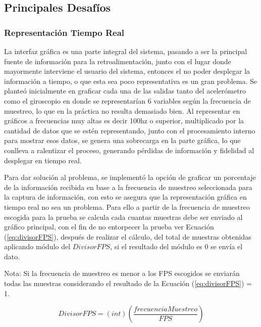 \documentclass[12pt,a4paper]{article}
\begin{document}
\begin{itemize}
\end{itemize}





\subsection{Principales Desafíos}
\subsubsection{Representación Tiempo Real}
La interfaz gráfica es una parte integral del sistema, pasando a ser la principal fuente de información para la retroalimentación, junto con el lugar donde mayormente interviene el usuario del sistema, entonces el no poder desplegar la información a tiempo, o que esta sea poco representativa es un gran problema. Se planteó inicialmente en graficar cada una de las salidas tanto del acelerómetro como el giroscopio en donde se representarían 6 variables según la frecuencia de muestreo, lo que en la práctica no resulta demasiado bien. Al representar en gráficos a frecuencias muy altas es decir 100hz o superior, multiplicado por la cantidad de datos que se estén representando, junto con el procesamiento interno para mostrar esos datos, se genera una sobrecarga en la parte gráfica, lo que conlleva a ralentizar el proceso, generando pérdidas de información y fidelidad al desplegar en tiempo real.

Para dar solución al problema, se implementó la opción de graficar un porcentaje de la información recibida en base a la frecuencia de muestreo seleccionada para la captura de información, con esto se asegura que la representación gráfica en tiempo real no sea un problema. Para ello a partir de la frecuencia de muestreo escogida para la prueba se calcula cada cuantas muestras debe ser enviado al gráfico principal, con el fin de no entorpecer la prueba ver Ecuación (\ref{eq:divisorFPS}), después de realizar el cálculo, del total de muestras obtenidas aplicando módulo del $DivisorFPS$, si el resultado del módulo es 0 se envía el dato.

Nota: Si la frecuencia de muestreo es menor a los FPS escogidos se enviarán todas las muestras considerando el resultado de la Ecuación (\ref{eq:divisorFPS}) = 1.

\begin{equation}
\label{eq:divisorFPS}
DivisorFPS=(int)\left(\frac{frecuenciaMuestreo}{FPS}\right)
\end{equation}
\end{document}
